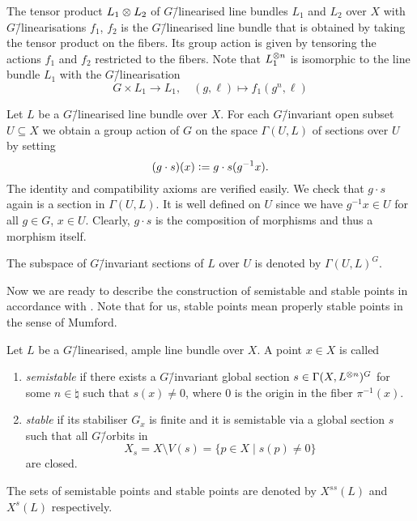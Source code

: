 \begin{remark}
	\label{remark:linearised_line_bundle_tensor}
	The tensor product $L_1 \otimes L_2$ of $G$\=/linearised line bundles $L_1$ and $L_2$ over $X$ with $G$\=/linearisations $f_1$, $f_2$ is the $G$\=/linearised line bundle that is obtained by taking the tensor product on the fibers. Its group action is given by tensoring the actions $f_1$ and $f_2$ restricted to the fibers. Note that $L_1^{\otimes n}$ is isomorphic to the line bundle $L_1$ with the $G$\=/linearisation
	$$G\times L_1 \longrightarrow L_1,\quad (g, \ell) \mapsto f_1(g^n, \ell)$$
\end{remark}

\begin{remark}
	Let $L$ be a $G$\=/linearised line bundle over $X$. For each $G$\=/invariant open subset $U\subseteq X$ we obtain a group action of $G$ on the space $\Gamma(U,L)$ of sections over $U$ by setting
	$$(g\cdot s)(x) \mathrel{\mathop:}= g\cdot s(g^{-1}x).$$
	The identity and compatibility axioms are verified easily. We check that $g\cdot s$ again is a section in $\Gamma(U,L)$. It is well defined on $U$ since we have $g^{-1}x\in U$ for all $g\in G$, $x\in U$. Clearly, $g\cdot s$ is the composition of morphisms and thus a morphism itself.
	
	The subspace of $G$\=/invariant sections of $L$ over $U$ is denoted by $\Gamma(U,L)^G$.
\end{remark}

Now we are ready to describe the construction of semistable and stable points in accordance with \cite[Definition 1.7 \& 1.8]{git}. Note that for us, stable points mean properly stable points in the sense of Mumford.

\begin{defi}
	Let $L$ be a $G$\=/linearised, ample line bundle over $X$. A point $x\in X$ is called
	\begin{enumerate}[label={\upshape(\roman*)}]
		\item \emph{semistable} if there exists a $G$\=/invariant global section $s\in\Gamma(X,L^{\otimes n})^G$ for some $n\in\natural$ such that $s(x)\neq 0$, where $0$ is the origin in the fiber $\pi^{-1}(x)$.
		\item \emph{stable} if its stabiliser $G_x$ is finite and it is semistable via a global section $s$ such that all $G$\=/orbits in 
		$$X_s = X\setminus V(s) = \{p\in X\mid s(p) \neq 0 \}$$
		are closed.
	\end{enumerate}
	The sets of semistable points and stable points are denoted by $X^{ss}(L)$ and $X^{s}(L)$ respectively.
\end{defi}

